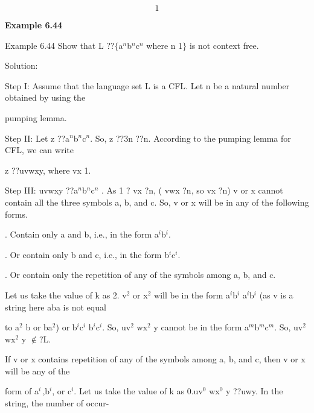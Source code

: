 

\noindent 

\noindent 

\noindent 

\noindent 
\[1\] 


\noindent 

\noindent \textbf{Example 6.44}

\noindent  Example 6.44 Show that L ??$\mathrm{\{}$a${}^{n}$b${}^{n}$c${}^{n}$ where n 1$\mathrm{\}}$ is not context free.

\noindent Solution:

\noindent Step I: Assume that the language set L is a CFL. Let n be a natural number obtained by using the

\noindent pumping lemma.

\noindent Step II: Let z ??a${}^{n}$b${}^{n}$c${}^{n}$. So, {\textbar} z {\textbar} ??3n ??n. According to the pumping lemma for CFL, we can write

\noindent z ??uvwxy, where {\textbar} vx {\textbar} 1.

\noindent Step III: uvwxy ??a${}^{n}$b${}^{n}$c${}^{n}$ . As 1 ?{\textbar} vx {\textbar} ?n, ({\textbar} vwx {\textbar} ?n, so {\textbar} vx {\textbar} ?n) v or x cannot contain all the three symbols a, b, and c. So, v or x will be in any of the following forms.

. Contain only a and b, i.e., in the form a${}^{i}$b${}^{i}$.

. Or contain only b and c, i.e., in the form b${}^{i}$c${}^{i}$.

. Or contain only the repetition of any of the symbols among a, b, and c.

\noindent Let us take the value of k as 2. v${}^{2}$ or x${}^{2}$ will be in the form a${}^{i}$b${}^{i}$ a${}^{i}$b${}^{i}$ (as v is a string here aba is not equal

\noindent to a${}^{2}$ b or ba${}^{2}$) or b${}^{i}$c${}^{i}$ b${}^{i}$c${}^{i}$. So, uv${}^{2}$ wx${}^{2}$ y cannot be in the form a${}^{m}$b${}^{m}$c${}^{m}$. So, uv${}^{2}$ wx${}^{2}$ y $\mathrm{\notin }$?L.

\noindent If v or x contains repetition of any of the symbols among a, b, and c, then v or x will be any of the

\noindent form of a${}^{i\ }$,b${}^{i}$, or c${}^{i}$. Let us take the value of k as 0.uv${}^{0}$ wx${}^{0}$ y ??uwy. In the string, the number of occur-

